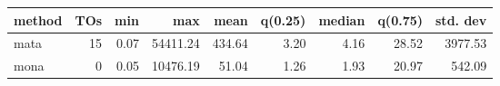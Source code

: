 \begin{tabular}{lrrrrrrrr}
\hline
 method   &   TOs &   min &      max &   mean &   q(0.25) &   median &   q(0.75) &   std. dev \\
\hline
 mata     & 15 &  0.07 & 54411.24 & 434.64 &      3.20 &     4.16 &     28.52 &    3977.53 \\
 mona     &  0 &  0.05 & 10476.19 &  51.04 &      1.26 &     1.93 &     20.97 &     542.09 \\
\hline
\end{tabular}
